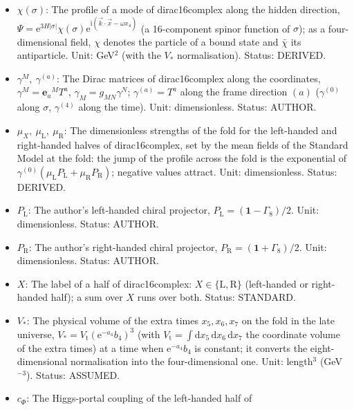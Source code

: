 \documentclass[
  10pt,
]{article}
\providecommand{\tightlist}{%
  \setlength{\itemsep}{0pt}\setlength{\parskip}{0pt}}
\begin{document}
\begin{itemize}
\tightlist
\item
  \(\chi(\sigma)\): The profile of a mode of dirac16complex along the
  hidden direction,
  \(\Psi = \mathrm{e}^{3H\lvert\sigma\rvert}\chi(\sigma)\mathrm{e}^{\mathrm{i}(\vec k\cdot\vec x - \omega x_4)}\)
  (a 16-component spinor function of \(\sigma\)); as a four-dimensional
  field, \(\chi\) denotes the particle of a bound state and \(\bar\chi\)
  its antiparticle. Unit: GeV\(^{2}\) (with the \(V_*\) normalisation).
  Status: DERIVED.
\item
  \(\gamma^M,\ \gamma^{(a)}\): The Dirac matrices of dirac16complex
  along the coordinates, \(\gamma^M = \mathbf{e}_a{}^MT^a\),
  \(\gamma_M = g_{MN}\gamma^N\); \(\gamma^{(a)} = T^a\) along the frame
  direction \((a)\) (\(\gamma^{(0)}\) along \(\sigma\), \(\gamma^{(4)}\)
  along the time). Unit: dimensionless. Status: AUTHOR.
\item
  \(\mu_X,\ \mu_{\mathrm{L}},\ \mu_{\mathrm{R}}\): The dimensionless
  strengths of the fold for the left-handed and right-handed halves of
  dirac16complex, set by the mean fields of the Standard Model at the
  fold: the jump of the profile across the fold is the exponential of
  \(\gamma^{(0)}(\mu_{\mathrm{L}}P_{\mathrm{L}} + \mu_{\mathrm{R}}P_{\mathrm{R}})\);
  negative values attract. Unit: dimensionless. Status: DERIVED.
\item
  \(P_{\mathrm{L}}\): The author's left-handed chiral projector,
  \(P_{\mathrm{L}} = (\mathbf{1} - \Gamma_8)/2\). Unit: dimensionless.
  Status: AUTHOR.
\item
  \(P_{\mathrm{R}}\): The author's right-handed chiral projector,
  \(P_{\mathrm{R}} = (\mathbf{1} + \Gamma_8)/2\). Unit: dimensionless.
  Status: AUTHOR.
\item
  \(X\): The label of a half of dirac16complex:
  \(X \in \{\mathrm{L}, \mathrm{R}\}\) (left-handed or right-handed
  half); a sum over \(X\) runs over both. Status: STANDARD.
\item
  \(V_*\): The physical volume of the extra times \(x_5, x_6, x_7\) on
  the fold in the late universe,
  \(V_* = V_{\mathrm{t}}(\mathrm{e}^{-a_4}b_4)^3\) (with
  \(V_{\mathrm{t}} = \int\mathrm{d}x_5\,\mathrm{d}x_6\,\mathrm{d}x_7\)
  the coordinate volume of the extra times) at a time when
  \(\mathrm{e}^{-a_4}b_4\) is constant; it converts the
  eight-dimensional normalisation into the four-dimensional one. Unit:
  length\(^3\) (GeV\(^{-3}\)). Status: ASSUMED.
\item
  \(c_\Phi\): The Higgs-portal coupling of the left-handed half of

\end{itemize}
\end{document}
